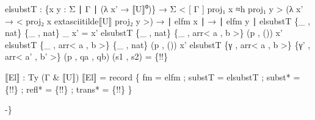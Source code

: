 {\begin{code}
{  elsubstT : \{x y : Σ ∣ Γ ∣ (λ x' → ⟦U⟧⁰)\} →
      Σ < [ Γ ] proj₁ x ≈h proj₁ y > (λ x' → < proj₂ x 	extasciitilde⟦U⟧ proj₂ y >) →
      ∣ elfm x ∣ → ∣ elfm y ∣
  elsubstT \{\_ , nat\} \{\_ , nat\} \_ x' = x'
  elsubstT \{\_ , nat\} \{\_ , arr< a , b >\} (p , ()) x'
  elsubstT \{\_ , arr< a , b >\} \{\_ , nat\} (p , ()) x'
  elsubstT \{γ , arr< a , b >\} \{γ' , arr< a' , b' >\} (p , qa , qb) (s1 , s2) = 
   \{!!\}

  ⟦El⟧ : Ty (Γ \& ⟦U⟧)
  ⟦El⟧ = record 
       \{ fm = elfm
       ; substT = elsubstT
       ; subst* = \{!!\}
       ; refl* = \{!!\}
       ; trans* = \{!!\} 
       \}

-\}}\<%
\\
%
\\
%
\\
%
\\
%
\\
\>\<\end{code}
}